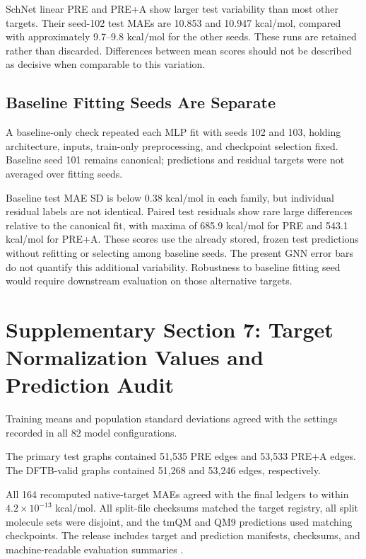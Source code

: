 SchNet linear PRE and PRE+A show larger test variability than most other targets. Their seed-102 test MAEs are 10.853 and 10.947 kcal/mol, compared with approximately 9.7--9.8 kcal/mol for the other seeds. These runs are retained rather than discarded. Differences between mean scores should not be described as decisive when comparable to this variation.

\subsection*{Baseline Fitting Seeds Are Separate}
A baseline-only check repeated each MLP fit with seeds 102 and 103, holding architecture, inputs, train-only preprocessing, and checkpoint selection fixed. Baseline seed 101 remains canonical; predictions and residual targets were not averaged over fitting seeds.

Baseline test MAE SD is below 0.38 kcal/mol in each family, but individual residual labels are not identical. Paired test residuals show rare large differences relative to the canonical fit, with maxima of 685.9 kcal/mol for PRE and 543.1 kcal/mol for PRE+A. These scores use the already stored, frozen test predictions without refitting or selecting among baseline seeds. The present GNN error bars do not quantify this additional variability. Robustness to baseline fitting seed would require downstream evaluation on those alternative targets.

\clearpage
\section*{Supplementary Section 7: Target Normalization Values and Prediction Audit}
Training means and population standard deviations agreed with the settings recorded in all 82 model configurations.

The primary test graphs contained 51,535 PRE edges and 53,533 PRE+A edges. The DFTB-valid graphs contained 51,268 and 53,246 edges, respectively.

All 164 recomputed native-target MAEs agreed with the final ledgers to within \(4.2\times10^{-13}\) kcal/mol. All split-file checksums matched the target registry, all split molecule sets were disjoint, and the tmQM and QM9 predictions used matching checkpoints. The release includes target and prediction manifests, checksums, and machine-readable evaluation summaries \cite{gameel2026correctedRelease}.




